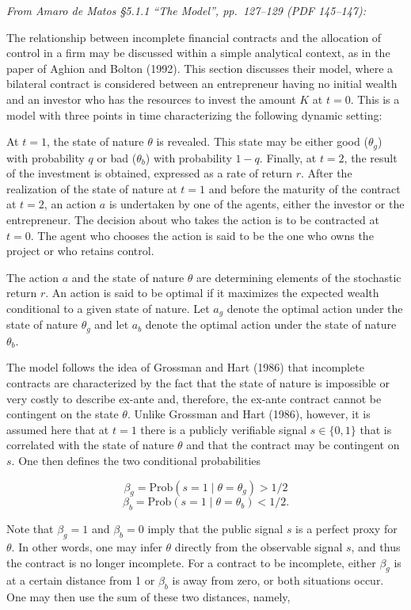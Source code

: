 \documentclass[11pt,a4paper]{article}
\begin{document}
\emph{From Amaro de Matos §5.1.1 ``The Model'', pp.~127--129 (PDF 145--147):}

The relationship between incomplete financial contracts and the allocation of control in a firm may
be discussed within a simple analytical context, as in the paper of Aghion and Bolton (1992). This
section discusses their model, where a bilateral contract is considered between an entrepreneur
having no initial wealth and an investor who has the resources to invest the amount \(K\) at
\(t = 0\). This is a model with three points in time characterizing the following dynamic setting:

At \(t = 1\), the state of nature \(\theta\) is revealed. This state may be either good
(\(\theta_g\)) with probability \(q\) or bad (\(\theta_b\)) with probability \(1 - q\). Finally, at
\(t = 2\), the result of the investment is obtained, expressed as a rate of return \(r\). After the
realization of the state of nature at \(t = 1\) and before the maturity of the contract at
\(t = 2\), an action \(a\) is undertaken by one of the agents, either the investor or the
entrepreneur. The decision about who takes the action is to be contracted at \(t = 0\). The agent
who chooses the action is said to be the one who owns the project or who retains control.

The action \(a\) and the state of nature \(\theta\) are determining elements of the stochastic
return \(r\). An action is said to be optimal if it maximizes the expected wealth conditional to a
given state of nature. Let \(a_g\) denote the optimal action under the state of nature \(\theta_g\)
and let \(a_b\) denote the optimal action under the state of nature \(\theta_b\).

The model follows the idea of Grossman and Hart (1986) that incomplete contracts are characterized
by the fact that the state of nature is impossible or very costly to describe ex-ante and,
therefore, the ex-ante contract cannot be contingent on the state \(\theta\). Unlike Grossman and
Hart (1986), however, it is assumed here that at \(t = 1\) there is a publicly verifiable signal
\(s \in \{0, 1\}\) that is correlated with the state of nature \(\theta\) and that the contract may
be contingent on \(s\). One then defines the two conditional probabilities

\[\beta_g = \text{Prob}(s = 1 \mid \theta = \theta_g) > 1/2\]
\[\beta_b = \text{Prob}(s = 1 \mid \theta = \theta_b) < 1/2.\]

Note that \(\beta_g = 1\) and \(\beta_b = 0\) imply that the public signal \(s\) is a perfect proxy
for \(\theta\). In other words, one may infer \(\theta\) directly from the observable signal \(s\),
and thus the contract is no longer incomplete. For a contract to be incomplete, either \(\beta_g\)
is at a certain distance from 1 or \(\beta_b\) is away from zero, or both situations occur. One may
then use the sum of these two distances, namely,
\end{document}
